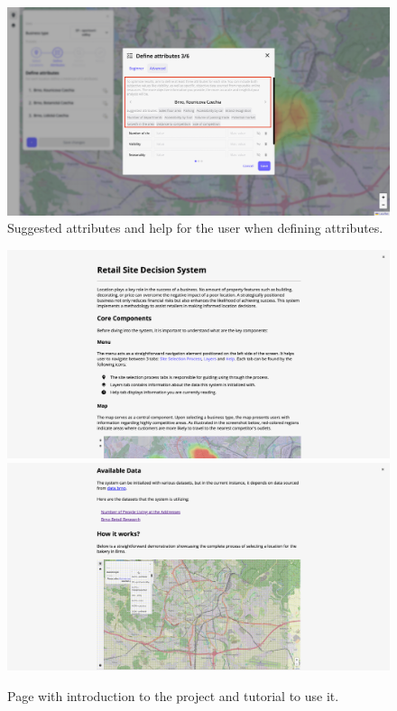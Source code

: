 \begin{figure}[ht]\centering
  \centering
  \includegraphics[width=0.9\linewidth]{obrazky-figures/ch7/improvement-define-attributes.png}
  \caption{Suggested attributes and help for the user when defining attributes.}
  \label{fig:improvementDefineAttributes}
\end{figure}

\begin{figure}[ht]
  \centering
  \includegraphics[width=1\linewidth]{obrazky-figures/ch7/tutor1.png}
  \vspace{10pt}
  \vspace{10pt}
  \includegraphics[width=1\linewidth]{obrazky-figures/ch7/tutor2.png}
  \caption{Page with introduction to the project and tutorial to use it.}
  \label{fig:tutorial}
\end{figure}
